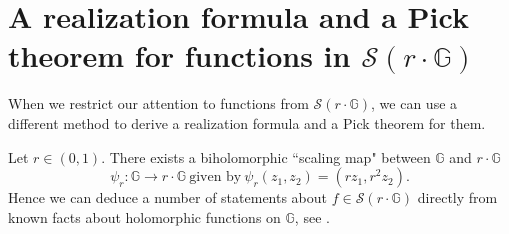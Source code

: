 \documentclass[12pt,reqno]{amsart}
\numberwithin{equation}{section}
\theoremstyle{definition}
\begin{document}
\section{A realization formula and a Pick theorem for functions in $\mathcal{S}(r\cdot\mathbb{G})$}\label{Pick}

When we restrict our attention to functions from $\mathcal{S}(r\cdot\mathbb{G})$, we can use a different method to derive a realization formula  and a Pick theorem for them.

Let $r\in(0,1)$.  There exists a biholomorphic ``scaling map" between  $\mathbb{G}$ and $r\cdot\mathbb{G}$ 
$$ \psi_r: \mathbb{G} \to r\cdot\mathbb{G} \ \text{given by} \ \psi_r(z_1, z_2)= (rz_1, r^2 z_2).$$
Hence we can deduce a number of statements about  $f\in\mathcal{S}(r \cdot \mathbb{G})$ directly from known facts about holomorphic functions on $\mathbb{G}$, see \cite{AY17}. 
\end{document}

